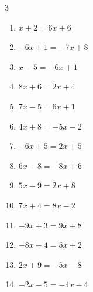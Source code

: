 \begin{multicols}{3}
\begin{enumerate}
  \item $x+2=6x+6$


  \item $-6x+1=-7x+8$

        \phantom{$\displaystyle x=7$}

  \item $x-5=-6x+1$


\columnbreak %

\resetques

  \item $8x+6=2x+4$


  \item $7x-5=6x+1$

        \phantom{$\displaystyle x=6$}

  \item $4x+8=-5x-2$


  \item $-6x+5=2x+5$

        \phantom{$\displaystyle x=0$}

  \item $6x-8=-8x+6$

        \phantom{$\displaystyle x=1$}

  \item $5x-9=2x+8$


  \item $7x+4=8x-2$

        \phantom{$\displaystyle x=6$}

  \item $-9x+3=9x+8$


  \item $-8x-4=5x+2$


  \item $2x+9=-5x-8$


  \item $-2x-5=-4x-4$


\end{enumerate}
\end{multicols}
